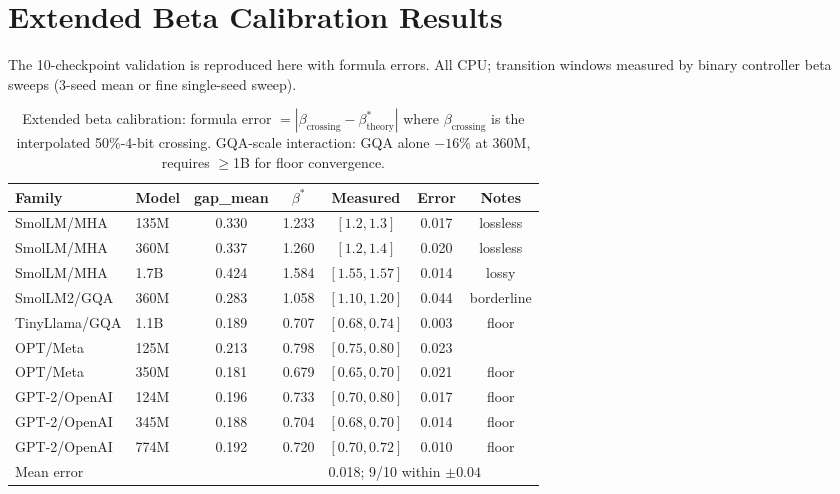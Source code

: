 \documentclass{article}
\begin{document}
\section{Extended Beta Calibration Results}
\label{app:extended}

The 10-checkpoint validation is reproduced here with formula errors. All CPU; transition
windows measured by binary controller beta sweeps (3-seed mean or fine single-seed sweep).

\begin{table}[h]
\centering
\caption{Extended beta calibration: formula error $= |\beta_\text{crossing} - \beta^*_\text{theory}|$
where $\beta_\text{crossing}$ is the interpolated 50\%-4-bit crossing. GQA-scale interaction:
GQA alone $-16\%$ at 360M, requires $\geq$1B for floor convergence.}
\begin{tabular}{llccccc}
\toprule
Family & Model & gap\_mean & $\beta^*$ & Measured & Error & Notes \\
\midrule
SmolLM/MHA & 135M & 0.330 & 1.233 & $[1.2, 1.3]$ & 0.017 & lossless \\
SmolLM/MHA & 360M & 0.337 & 1.260 & $[1.2, 1.4]$ & 0.020 & lossless \\
SmolLM/MHA & 1.7B & 0.424 & 1.584 & $[1.55, 1.57]$ & 0.014 & lossy \\
SmolLM2/GQA & 360M & 0.283 & 1.058 & $[1.10, 1.20]$ & 0.044 & borderline \\
TinyLlama/GQA & 1.1B & 0.189 & 0.707 & $[0.68, 0.74]$ & 0.003 & floor \\
OPT/Meta & 125M & 0.213 & 0.798 & $[0.75, 0.80]$ & 0.023 & \\
OPT/Meta & 350M & 0.181 & 0.679 & $[0.65, 0.70]$ & 0.021 & floor \\
GPT-2/OpenAI & 124M & 0.196 & 0.733 & $[0.70, 0.80]$ & 0.017 & floor \\
GPT-2/OpenAI & 345M & 0.188 & 0.704 & $[0.68, 0.70]$ & 0.014 & floor \\
GPT-2/OpenAI & 774M & 0.192 & 0.720 & $[0.70, 0.72]$ & 0.010 & floor \\
\midrule
\multicolumn{4}{l}{Mean error} & \multicolumn{3}{l}{0.018; 9/10 within $\pm0.04$} \\
\bottomrule
\end{tabular}
\label{tab:extended}
\end{table}



\end{document}
